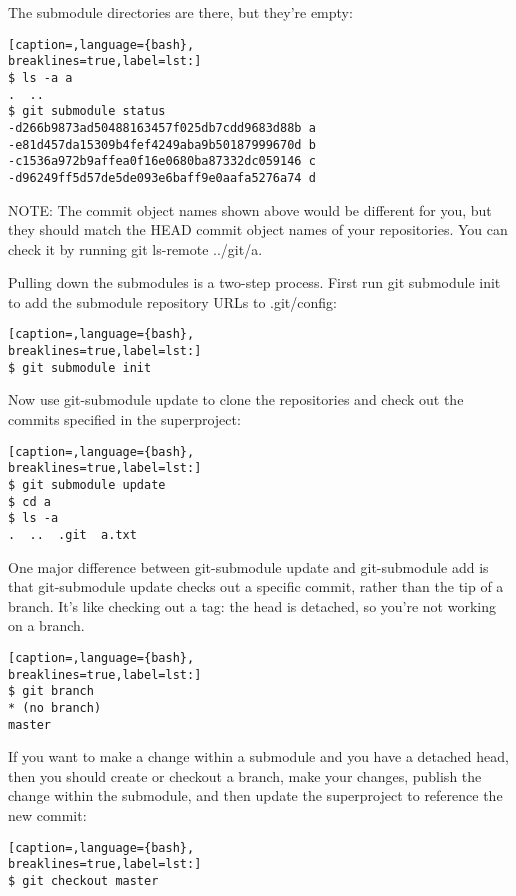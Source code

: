 The submodule directories are there, but they're empty:
\lstset{basicstyle=\scriptsize, numbers=none, captionpos=b, tabsize=4}
\begin{lstlisting}[caption=,language={bash},
breaklines=true,label=lst:]
$ ls -a a
.  ..
$ git submodule status
-d266b9873ad50488163457f025db7cdd9683d88b a
-e81d457da15309b4fef4249aba9b50187999670d b
-c1536a972b9affea0f16e0680ba87332dc059146 c
-d96249ff5d57de5de093e6baff9e0aafa5276a74 d
\end{lstlisting}

NOTE: The commit object names shown above would be different for you, but they
should match the HEAD commit object names of your repositories. You can check
it by running git ls-remote ../git/a.

Pulling down the submodules is a two-step process. First run git submodule init
to add the submodule repository URLs to .git/config:
\lstset{basicstyle=\scriptsize, numbers=none, captionpos=b, tabsize=4}
\begin{lstlisting}[caption=,language={bash},
breaklines=true,label=lst:]
$ git submodule init
\end{lstlisting}

Now use git-submodule update to clone the repositories and check out the
commits specified in the superproject:
\lstset{basicstyle=\scriptsize, numbers=none, captionpos=b, tabsize=4}
\begin{lstlisting}[caption=,language={bash},
breaklines=true,label=lst:]
$ git submodule update
$ cd a
$ ls -a
.  ..  .git  a.txt
\end{lstlisting}

One major difference between git-submodule update and git-submodule add is that
git-submodule update checks out a specific commit, rather than the tip of a
branch. It's like checking out a tag: the head is detached, so you're not
working on a branch.
\lstset{basicstyle=\scriptsize, numbers=none, captionpos=b, tabsize=4}
\begin{lstlisting}[caption=,language={bash},
breaklines=true,label=lst:]
$ git branch
* (no branch)
master
\end{lstlisting}

If you want to make a change within a submodule and you have a detached head,
then you should create or checkout a branch, make your changes, publish the
change within the submodule, and then update the superproject to reference the
new commit:
\lstset{basicstyle=\scriptsize, numbers=none, captionpos=b, tabsize=4}
\begin{lstlisting}[caption=,language={bash},
breaklines=true,label=lst:]
$ git checkout master
\end{lstlisting}

